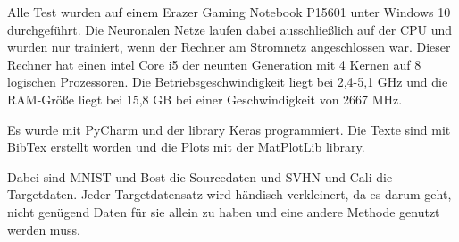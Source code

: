 Alle Test wurden auf einem Erazer Gaming Notebook P15601 unter Windows 10 durchgeführt.
Die Neuronalen Netze laufen dabei ausschließlich auf 
der CPU und wurden nur trainiert, wenn der Rechner am Stromnetz angeschlossen war. 
Dieser Rechner hat einen intel Core i5 der neunten Generation mit 4 Kernen auf 8 
logischen Prozessoren. Die Betriebsgeschwindigkeit liegt bei 2,4-5,1 GHz und die 
RAM-Größe liegt bei 15,8 GB bei einer Geschwindigkeit von 2667 MHz. 

Es wurde mit PyCharm und der library Keras programmiert. Die Texte sind mit BibTex 
erstellt worden und die Plots mit der MatPlotLib library.

Dabei sind MNIST und Bost die Sourcedaten und SVHN und Cali die Targetdaten. Jeder Targetdatensatz 
wird händisch verkleinert, da es darum geht, nicht genügend Daten für sie allein zu haben und eine andere 
Methode genutzt werden muss.

